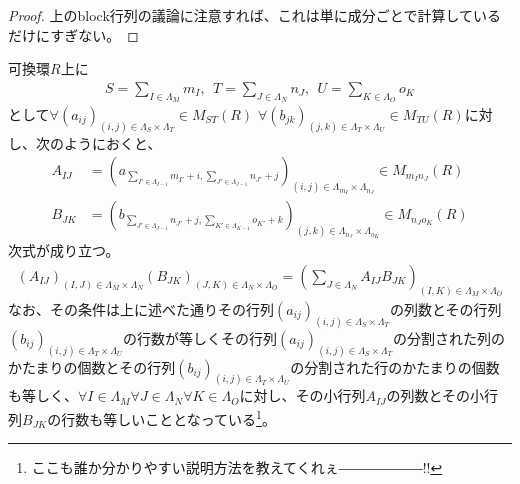 \documentclass[dvipdfmx]{jsarticle}
\begin{document}
\begin{proof}
上のblock行列の議論に注意すれば、これは単に成分ごとで計算しているだけにすぎない。
\end{proof}
\begin{thm}\label{2.1.3.19}
可換環$R$上に
\begin{align*}
S=\sum_{I \in \varLambda_{M}} m_{I} ,\ \ T=\sum_{J \in \varLambda_{N}} n_{J},\ \ U=\sum_{K \in \varLambda_{O}} o_{K}
\end{align*}
として$\forall \left( a_{ij} \right)_{(i,j) \in \varLambda_{S} \times \varLambda_{T}} \in M_{ST}(R)$ $\forall \left( b_{jk} \right)_{(j,k) \in \varLambda_{T} \times \varLambda_{U}} \in M_{TU}(R)$に対し、次のようにおくと、
\begin{align*}
A_{IJ} &=\left( a_{\sum_{I' \in \varLambda_{I - 1}} m_{I'} + i,\sum_{J' \in \varLambda_{J - 1}} n_{J'} + j} \right)_{(i,j) \in \varLambda_{m_{I}} \times \varLambda_{n_{J}}} \in M_{m_{I}n_{J}}(R) \\
B_{JK} &=\left( b_{\sum_{J' \in \varLambda_{J - 1}} n_{J'} + j,\sum_{K' \in \varLambda_{K - 1}} o_{K'} + k} \right)_{(j,k) \in \varLambda_{n_{J}} \times \varLambda_{o_{K}}} \in M_{n_{J}o_{K}}(R) 
\end{align*}
次式が成り立つ。
\begin{align*}
\left( A_{IJ} \right)_{(I,J) \in \varLambda_{M} \times \varLambda_{N}} \left( B_{JK} \right)_{(J,K) \in \varLambda_{N} \times \varLambda_{O}} = \left( \sum_{J\in \varLambda_{N} } A_{IJ} B_{JK} \right)_{(I,K) \in \varLambda_{M} \times \varLambda_{O}}
\end{align*}
なお、その条件は上に述べた通りその行列$\left( a_{ij} \right)_{(i,j) \in \varLambda_{S} \times \varLambda_{T}}$の列数とその行列$\left( b_{ij} \right)_{(i,j) \in \varLambda_{T} \times \varLambda_{U}}$の行数が等しくその行列$\left( a_{ij} \right)_{(i,j) \in \varLambda_{S} \times \varLambda_{T}}$の分割された列のかたまりの個数とその行列$\left( b_{ij} \right)_{(i,j) \in \varLambda_{T} \times \varLambda_{U}}$の分割された行のかたまりの個数も等しく、$\forall I\in \varLambda_{M} \forall J\in \varLambda_{N} \forall K\in \varLambda_{O} $に対し、その小行列$A_{IJ}$の列数とその小行列$B_{JK}$の行数も等しいこととなっている\footnote{ここも誰か分かりやすい説明方法を教えてくれぇ――――――!! }。
\end{thm}
\end{document}
